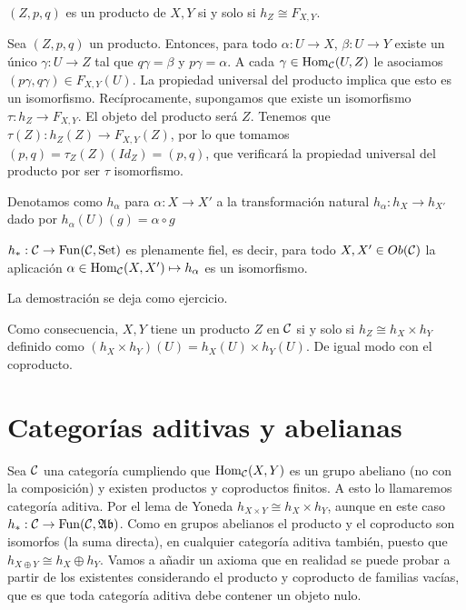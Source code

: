 \documentclass[GA.tex]{subfiles}
\begin{document}
\begin{prop}
$(Z,p,q)$ es un producto de $X,Y$ si y solo si $h_Z\cong F_{X,Y}$. 
\end{prop}
\begin{dem}
Sea $(Z,p,q)$ un producto. Entonces, para todo $\alpha:U\to X$, $\beta:U\to Y$ existe un único $\gamma:U\to Z$ tal que $q\gamma=\beta$ y $p\gamma=\alpha$. A cada $\gamma\in\operatorname{Hom}_{\mathcal{C}}(U,Z)$ le asociamos $(p\gamma,q\gamma)\in F_{X,Y}(U)$. La propiedad universal del producto implica que esto es un isomorfismo. Recíprocamente, supongamos que existe un isomorfismo $\tau:h_Z\to F_{X,Y}$. El objeto del producto será $Z$. Tenemos que $\tau(Z):h_Z(Z)\to F_{X,Y}(Z)$, por lo que tomamos $(p,q)=\tau_Z(Z)(Id_Z)=(p,q)$, que verificará la propiedad universal del producto por ser $\tau$ isomorfismo. 
\end{dem}

Denotamos como $h_{\alpha}$ para $\alpha:X\to X'$ a la transformación natural $h_{\alpha}:h_X\to h_{X'}$ dado por $h_{\alpha}(U)(g)=\alpha\circ g$

\begin{lemma}[de Yoneda]
$h_*:\mathcal{C}\to \mathrm{Fun}(\mathcal{C}, \mathrm{Set})$ es plenamente fiel, es decir, para todo $X,X'\in Ob(\mathcal{C})$ la aplicación $\alpha\in\operatorname{Hom}_{\mathcal{C}}(X,X')\mapsto h_{\alpha}$ es un isomorfismo. 
\end{lemma}
La demostración se deja como ejercicio. 

Como consecuencia, $X,Y$ tiene un producto $Z$ en $\mathcal{C}$ si y solo si $h_Z\cong h_X\times h_Y$ definido como $(h_X\times h_Y)(U)=h_X(U)\times h_Y(U)$. De igual modo con el coproducto. 

\section{Categorías aditivas y abelianas}
Sea $\mathcal{C}$ una categoría cumpliendo que $\operatorname{Hom}_{\mathcal{C}}(X,Y)$ es un grupo abeliano (no con la composición) y existen productos y coproductos finitos. A esto lo llamaremos categoría aditiva. Por el lema de Yoneda $h_{X\times Y}\cong h_X\times h_Y$, aunque en este caso $h_*:\mathcal{C}\to\mathrm{Fun}(\mathcal{C}, \mathfrak{Ab})$. Como en grupos abelianos el producto y el coproducto son isomorfos (la suma directa), en cualquier categoría aditiva también, puesto que $h_{X\oplus Y}\cong h_X\oplus h_Y$. Vamos a añadir un axioma que en realidad se puede probar a partir de los existentes considerando el producto y coproducto de familias vacías, que es que toda categoría aditiva debe contener un objeto nulo. 
\end{document}
